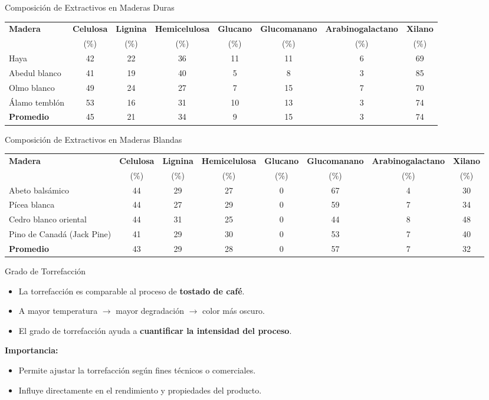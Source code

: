 \documentclass[main.tex]{subfiles}
\begin{document}
\begin{frame}{Composición de Extractivos en Maderas Duras}
\tiny
\begin{tabular}{|l|c|c|c|c|c|c|c|}
\hline
\textbf{Madera} & \textbf{Celulosa} & \textbf{Lignina} & \textbf{Hemicelulosa} & \textbf{Glucano} & \textbf{Glucomanano} & \textbf{Arabinogalactano} & \textbf{Xilano} \\
 & (\%) & (\%) & (\%) & (\%) & (\%) & (\%) & (\%) \\
\hline
Haya & 42 & 22 & 36 & 11 & 11 & 6 & 69 \\
Abedul blanco & 41 & 19 & 40 & 5 & 8 & 3 & 85 \\
Olmo blanco & 49 & 24 & 27 & 7 & 15 & 7 & 70 \\
Álamo temblón & 53 & 16 & 31 & 10 & 13 & 3 & 74 \\
\textbf{Promedio} & 45 & 21 & 34 & 9 & 15 & 3 & 74 \\
\hline
\end{tabular}
\end{frame}

\begin{frame}{Composición de Extractivos en Maderas Blandas}
\tiny
\begin{tabular}{|l|c|c|c|c|c|c|c|}
\hline
\textbf{Madera} & \textbf{Celulosa} & \textbf{Lignina} & \textbf{Hemicelulosa} & \textbf{Glucano} & \textbf{Glucomanano} & \textbf{Arabinogalactano} & \textbf{Xilano} \\
 & (\%) & (\%) & (\%) & (\%) & (\%) & (\%) & (\%) \\
\hline
Abeto balsámico & 44 & 29 & 27 & 0 & 67 & 4 & 30 \\
Pícea blanca & 44 & 27 & 29 & 0 & 59 & 7 & 34 \\
Cedro blanco oriental & 44 & 31 & 25 & 0 & 44 & 8 & 48 \\
Pino de Canadá (Jack Pine) & 41 & 29 & 30 & 0 & 53 & 7 & 40 \\
\textbf{Promedio} & 43 & 29 & 28 & 0 & 57 & 7 & 32 \\
\hline
\end{tabular}
\end{frame}



\begin{frame}{Grado de Torrefacción}
\begin{itemize}
  \item La torrefacción es comparable al proceso de \textbf{tostado de café}.
  \item A mayor temperatura $\rightarrow$ mayor degradación $\rightarrow$ color más oscuro.
  \item El grado de torrefacción ayuda a \textbf{cuantificar la intensidad del proceso}.
\end{itemize}
\vspace{0.5em}
\textbf{Importancia:}
\begin{itemize}
  \item Permite ajustar la torrefacción según fines técnicos o comerciales.
  \item Influye directamente en el rendimiento y propiedades del producto.
\end{itemize}
\end{frame}
\end{document}
